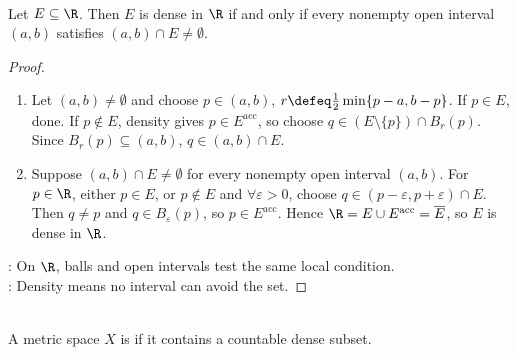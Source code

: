 \begin{proposition} \label{prop:dense-closure-and-interval-test} \\
Let $E\subseteq\R$. Then $E$ is dense in $\R$ if and only if every nonempty open interval $(a,b)$ satisfies $(a,b)\cap E\neq\emptyset$.
\begin{proof}
\begin{enumerate}[label=\roman*.]
\setlength{\itemsep}{0pt}
\item[$(\Rightarrow)$] Let $(a,b)\ne\emptyset$ and choose $p\in(a,b)$, $r\defeq\frac12\min\{p-a,b-p\}$. If $p\in E$, done. If $p\notin E$, density gives $p\in E^{\operatorname{acc}}$, so choose $q\in(E\setminus\{p\})\cap B_r(p)$. Since $B_r(p)\subseteq(a,b)$, $q\in(a,b)\cap E$.
\item[$(\Leftarrow)$] Suppose $(a,b)\cap E\ne\emptyset$ for every nonempty open interval $(a,b)$. For $p\in\R$, either $p\in E$, or $p\notin E$ and $\forall\varepsilon>0$, choose $q\in(p-\varepsilon,p+\varepsilon)\cap E$. Then $q\ne p$ and $q\in B_\varepsilon(p)$, so $p\in E^{\operatorname{acc}}$. Hence $\R=E\cup E^{\operatorname{acc}}=\overline{E}$, so $E$ is dense in $\R$.
\end{enumerate}
: On $\R$, balls and open intervals test the same local condition.\\
: Density means no interval can avoid the set.
\end{proof}
\end{proposition}

\begin{definition} \label{def:separable-metric-space} \\
A metric space $X$ is  if it contains a countable dense subset.
\end{definition}

